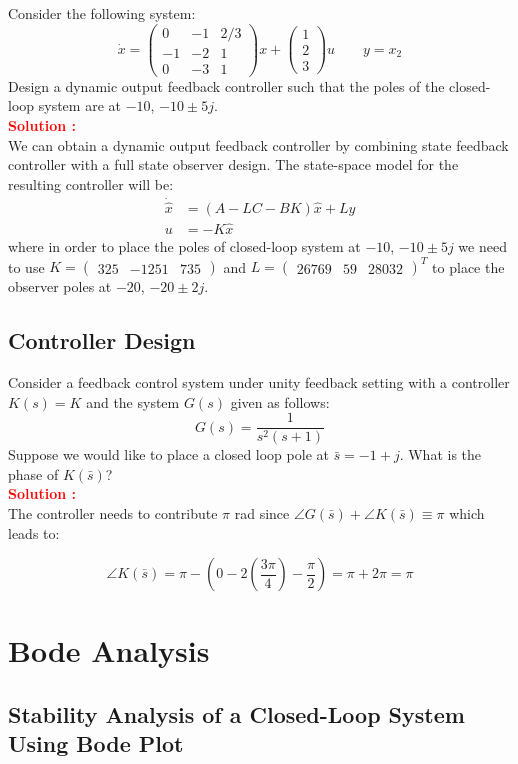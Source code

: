 \documentclass[12pt]{article}
\newcommand{\pmat}[1]{\begin{pmatrix} #1 \end{pmatrix}}
\begin{document}
Consider the following system:
\[
\dot{x}=\pmat{0 & -1 & 2/3 \\ -1 & -2 & 1 \\ 0 & -3 & 1 } x +\pmat{1 \\ 2 \\ 3}u \qquad y=x_2
\]
Design a dynamic output feedback controller such that the poles of the closed-loop system are at $-10$, $-10 \pm 5j$. \\

\textbf{\textcolor{red}{Solution :}} \\
We can obtain a dynamic output feedback controller by combining state feedback controller with a full state observer design. The state-space model for the resulting controller will be:
\begin{equation}
    \begin{split}
        \dot{\hat{x}} &=(A-LC-BK)\hat{x} +L y \\
        u &=-K \hat{x}
    \end{split}
\end{equation}
where in order to place the poles of closed-loop system at $-10$, $-10 \pm 5j$ we need to use $K= \pmat{325 & -1251 & 735}$ and $L=\pmat{26769 & 59 & 28032}^T$ to place the observer poles at $-20$, $-20 \pm 2j$.
\clearpage

\subsection{Controller Design}

Consider a feedback control system under unity feedback setting with a controller $K(s)=K$ and the system $G(s)$ given as follows:
\[
G(s)=\frac{1}{s^2(s+1)}
\]
Suppose we would like to place a closed loop pole at $\bar{s}=-1+j$. What is the phase of $K(\bar{s})$?  \\
\textbf{\textcolor{red}{Solution :}} \\
The controller needs to contribute $\pi $ rad since $\angle G(\bar{s}) +\angle K(\bar{s}) \equiv \pi$ which leads to:

\[
 \angle K(\bar{s}) = \pi - \left( 0 - 2\left( \frac{3 \pi}{4} \right) -\frac{\pi}{2}\right)= \pi +2 \pi =\pi 
\]
\clearpage

\section{Bode Analysis}
\subsection{Stability Analysis of a Closed-Loop System Using Bode Plot}
\end{document}
